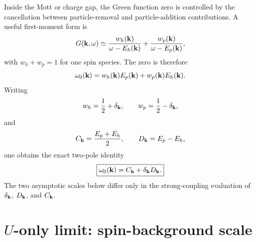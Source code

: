 \documentclass[11pt]{article}
\newcommand{\dd}{\delta_{\bf k}}
\newcommand{\Ck}{C_{\bf k}}
\newcommand{\Dk}{D_{\bf k}}
\begin{document}
Inside the Mott or charge gap, the Green function zero is controlled by the cancellation
between particle-removal and particle-addition contributions.  A useful first-moment form is
\begin{equation}
  G({\bf k},\omega)
  \simeq
  \frac{w_h({\bf k})}{\omega-E_h({\bf k})}
  +
  \frac{w_p({\bf k})}{\omega-E_p({\bf k})},
\end{equation}
with $w_h+w_p=1$ for one spin species.  The zero is therefore
\begin{equation}
  \omega_0({\bf k})=w_h({\bf k})E_p({\bf k})+w_p({\bf k})E_h({\bf k}).
\end{equation}
Writing
\begin{equation}
  w_h=\frac12+\dd,
  \qquad
  w_p=\frac12-\dd,
\end{equation}
and
\begin{equation}
  \Ck=\frac{E_p+E_h}{2},
  \qquad
  \Dk=E_p-E_h,
\end{equation}
one obtains the exact two-pole identity
\begin{equation}
  \boxed{\omega_0({\bf k})=\Ck+\dd\Dk.}
  \label{eq:common-zero}
\end{equation}
The two asymptotic scales below differ only in the strong-coupling evaluation of
$\dd$, $\Dk$, and $\Ck$.

\section{$U$-only limit: spin-background scale}
\end{document}
